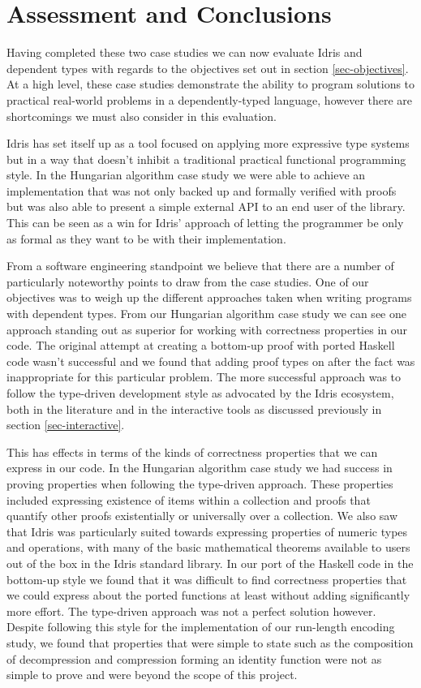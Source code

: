 \documentclass[a4paper, notitlepage]{report}
\begin{document}
\chapter{Assessment and Conclusions}
\label{sec:org3591813}

Having completed these two case studies we can now evaluate Idris and dependent
types with regards to the objectives set out in section \ref{sec-objectives}. At a
high level, these case studies demonstrate the ability to program solutions to
practical real-world problems in a dependently-typed language, however there are
shortcomings we must also consider in this evaluation.

Idris has set itself up as a tool focused on applying more expressive type
systems but in a way that doesn't inhibit a traditional practical functional
programming style. In the Hungarian algorithm case study we were able to achieve
an implementation that was not only backed up and formally verified with proofs
but was also able to present a simple external API to an end user of the
library. This can be seen as a win for Idris' approach of letting the programmer
be only as formal as they want to be with their implementation.

From a software engineering standpoint we believe that there are a number of
particularly noteworthy points to draw from the case studies. One of our
objectives was to weigh up the different approaches taken when writing programs
with dependent types. From our Hungarian algorithm case study we can see one
approach standing out as superior for working with correctness properties in our
code. The original attempt at creating a bottom-up proof with ported Haskell
code wasn't successful and we found that adding proof types on after the fact
was inappropriate for this particular problem. The more successful approach was
to follow the type-driven development style as advocated by the Idris ecosystem,
both in the literature \cite{brady_book_2017} and in the interactive tools as
discussed previously in section \ref{sec-interactive}.

This has effects in terms of the kinds of correctness properties that we can
express in our code. In the Hungarian algorithm case study we had success in
proving properties when following the type-driven approach. These properties
included expressing existence of items within a collection and proofs that
quantify other proofs existentially or universally over a collection. We also
saw that Idris was particularly suited towards expressing properties of numeric
types and operations, with many of the basic mathematical theorems available to
users out of the box in the Idris standard library. In our port of the Haskell
code in the bottom-up style we found that it was difficult to find correctness
properties that we could express about the ported functions at least without
adding significantly more effort. The type-driven approach was not a perfect
solution however. Despite following this style for the implementation of our
run-length encoding study, we found that properties that were simple to state
such as the composition of decompression and compression forming an identity
function were not as simple to prove and were beyond the scope of this project.
\end{document}
